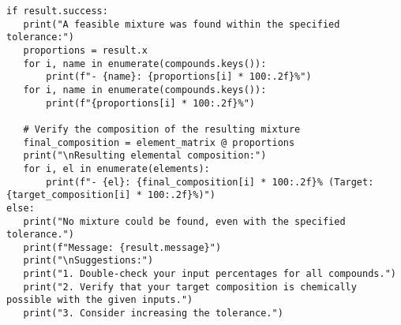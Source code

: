 \documentclass{article}
\begin{document}
\begin{lstlisting}
if result.success:
   print("A feasible mixture was found within the specified tolerance:")
   proportions = result.x
   for i, name in enumerate(compounds.keys()):
       print(f"- {name}: {proportions[i] * 100:.2f}%")
   for i, name in enumerate(compounds.keys()):
       print(f"{proportions[i] * 100:.2f}%")
  
   # Verify the composition of the resulting mixture
   final_composition = element_matrix @ proportions
   print("\nResulting elemental composition:")
   for i, el in enumerate(elements):
       print(f"- {el}: {final_composition[i] * 100:.2f}% (Target: {target_composition[i] * 100:.2f}%)")
else:
   print("No mixture could be found, even with the specified tolerance.")
   print(f"Message: {result.message}")
   print("\nSuggestions:")
   print("1. Double-check your input percentages for all compounds.")
   print("2. Verify that your target composition is chemically possible with the given inputs.")
   print("3. Consider increasing the tolerance.")
\end{lstlisting}
\end{document}
